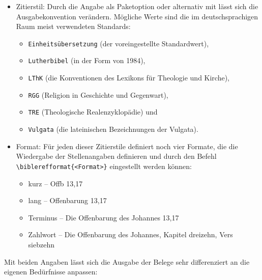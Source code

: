 \begin{itemize}
    \item Zitierstil:
    Durch die Angabe als Paketoption oder alternativ mit  lässt sich die Ausgabekonvention verändern.
    Mögliche Werte sind die im deutschsprachigen Raum meist verwendeten Standards: 
    \begin{itemize}
        \item \lstinline/Einheitsübersetzung/ (der voreingestellte Standardwert),
        \item \lstinline/Lutherbibel/ (in der Form von 1984),
        \item \lstinline/LThK/ (die Konventionen des Lexikons für Theologie und Kirche),
        \item \lstinline/RGG/ (Religion in Geschichte und Gegenwart),
        \item \lstinline/TRE/ (Theologische Realenzyklopädie) und 
        \item \lstinline/Vulgata/ (die lateinischen Bezeichnungen der Vulgata).
    \end{itemize}
    
    \item Format:
    Für jeden dieser Zitierstile definiert  noch vier Formate, die die Wiedergabe der
    Stellenangaben definieren und durch den Befehl \lstinline/\biblerefformat{<Format>}/ eingestellt
    werden können:
    
    \begin{itemize}
        \item kurz -- Offb 13,17
        \item lang -- Offenbarung 13,17
        \item Terminus -- Die Offenbarung des Johannes 13,17
        \item Zahlwort -- Die Offenbarung des Johannes, Kapitel dreizehn, Vers siebzehn
    \end{itemize}
    
\end{itemize}

Mit beiden Angaben lässt sich die Ausgabe der Belege sehr differenziert an die eigenen Bedürfnisse 
anpassen:

%

